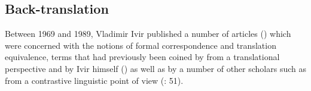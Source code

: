 \subsection{\label{sec:2.3.2}  Back-translation}

Between 1969 and 1989, Vladimir Ivir published a number of articles (\citealt{ivir_contrasting_1969, ivir_remarks_1970, ivir_formal_1981, ivir_translation-based_1983, dirven_functionalism_1987, radovanovi_translation_1989}) which were concerned with the notions of formal correspondence and translation equivalence, terms that had previously been coined by \citet{catford_linguistic_1965} from a translational perspective and by Ivir himself (\citeyear{ivir_contrasting_1969, ivir_remarks_1970}) as well as by a number of other scholars such as \citet{nickel_equivalence_1970, nickel_kontrastive_1972} from a contrastive linguistic point of view (\citealt{ivir_formal_1981}: 51).



